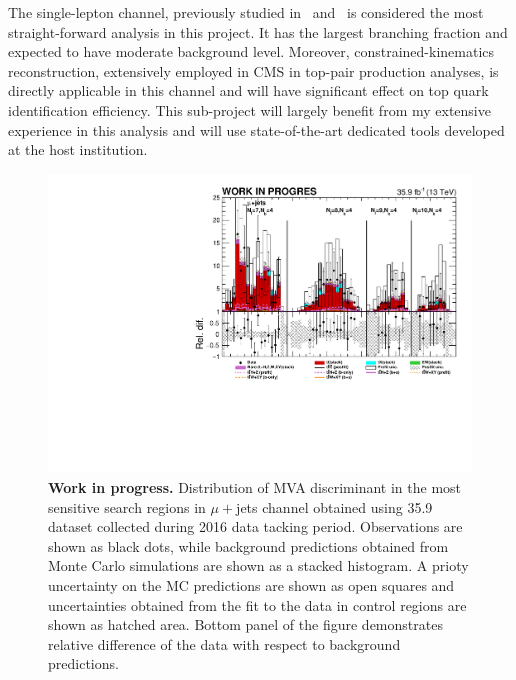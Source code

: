 \textcolor{\mynew}{The single-lepton channel, previously studied in~\cite{CMS:2016wig,Beck:2016hyi} and~\cite{Khachatryan:2014sca} is considered the most straight-forward analysis in this project. It has the largest branching fraction and expected to have moderate background level. Moreover, constrained-kinematics reconstruction, extensively employed in CMS in top-pair production analyses, is directly applicable in this channel and will have significant effect on top quark identification efficiency. This sub-project will largely benefit from my extensive experience in this analysis and will use state-of-the-art dedicated tools developed at the host institution. \begin{figure}
\centering
\includegraphics[width=\linewidth]{figures/mu}
\caption{\textbf{Work in progress.} Distribution of MVA discriminant in the most sensitive search regions in $\mu+$jets channel obtained using 35.9 \invfb dataset collected during 2016 data tacking period. Observations are shown as black dots, while background predictions obtained from Monte Carlo simulations are shown as a stacked histogram. A prioty uncertainty on the MC predictions are shown as open squares and uncertainties obtained from the fit to the data in control regions are shown as hatched area. Bottom panel of the figure demonstrates relative difference of the data with respect to background predictions.}
\label{fig:mu}
\end{figure}
}
